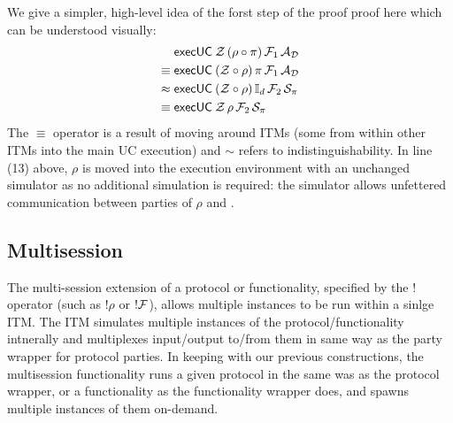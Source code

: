 We give a simpler, high-level idea of the forst step of the proof proof here which can be understood visually:
\begin{align}
& {\mathsf {execUC}} \: \mathcal{Z} \, (\rho \circ \pi) \, \mathcal{F}_1 \, \mathcal{A}_\mathcal{D} \\
\equiv \; & {\mathsf {execUC}} \: (\mathcal{Z} \circ \rho) \, \pi \, \mathcal{F}_1 \, \mathcal{A}_\mathcal{D} \\
\approx \; & {\mathsf {execUC}} \: (\mathcal{Z} \circ \rho) \, \mathbb{I}_d \, \mathcal{F}_2 \, \mathcal{S}_{\pi} \\
\equiv \; & {\mathsf {execUC}} \: \mathcal{Z} \, \rho \, \mathcal{F}_2 \, \mathcal{S}_{\pi} 
\end{align}
The $\equiv$ operator is a result of moving around ITMs (some from within other ITMs into the main UC execution) and $\sim$ refers to indistinguishability.
In line (13) above, $\rho$ is moved into the execution environment with an unchanged simulator as no additional simulation is required: the simulator allows unfettered communication between parties of $\rho$ and \Z.

\subsection{Multisession}
The multi-session extension of a protocol or functionality, specified by the $!$ operator (such as $!\rho$ or $!\mathcal{F}$), allows multiple instances to be run within a sinlge ITM.
The ITM simulates multiple instances of the protocol/functionality intnerally and multiplexes input/output to/from them in same way as the party wrapper for protocol parties.
In keeping with our previous constructions, the multisession functionality runs a given protocol in the same was as the protocol wrapper, or a functionality as the functionality wrapper does, and spawns multiple instances of them on-demand.

